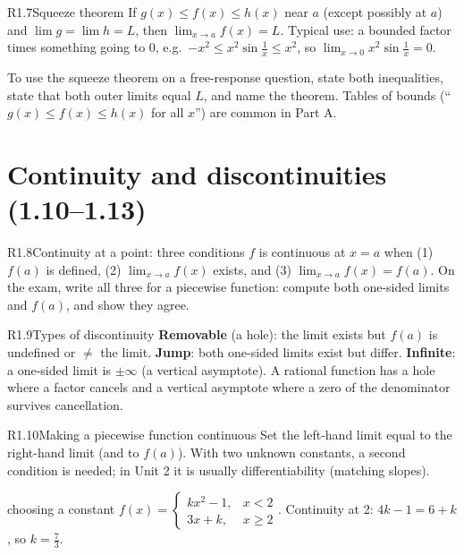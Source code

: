 \documentclass{apcalc}
\begin{document}
\begin{rulebox}{R1.7}{Squeeze theorem}
If $g(x)\le f(x)\le h(x)$ near $a$ (except possibly at $a$) and $\lim g=\lim h=L$, then $\lim_{x\to a}f(x)=L$. Typical use: a bounded factor times something going to 0, e.g.\ $-x^2\le x^2\sin\frac1x\le x^2$, so $\lim_{x\to0}x^2\sin\frac1x=0$.
\end{rulebox}

\begin{frqtip}
To use the squeeze theorem on a free-response question, state both inequalities, state that both outer limits equal $L$, and name the theorem. Tables of bounds (``$g(x)\le f(x)\le h(x)$ for all $x$'') are common in Part A.
\end{frqtip}

\section{Continuity and discontinuities (1.10--1.13)}

\begin{rulebox}{R1.8}{Continuity at a point: three conditions}
$f$ is continuous at $x=a$ when (1) $f(a)$ is defined, (2) $\lim_{x\to a}f(x)$ exists, and (3) $\lim_{x\to a}f(x)=f(a)$. On the exam, write all three for a piecewise function: compute both one-sided limits and $f(a)$, and show they agree.
\end{rulebox}

\begin{rulebox}{R1.9}{Types of discontinuity}
\textbf{Removable} (a hole): the limit exists but $f(a)$ is undefined or $\neq$ the limit. \textbf{Jump}: both one-sided limits exist but differ. \textbf{Infinite}: a one-sided limit is $\pm\infty$ (a vertical asymptote). A rational function has a hole where a factor cancels and a vertical asymptote where a zero of the denominator survives cancellation.
\end{rulebox}

\begin{rulebox}{R1.10}{Making a piecewise function continuous}
Set the left-hand limit equal to the right-hand limit (and to $f(a)$). With two unknown constants, a second condition is needed; in Unit 2 it is usually differentiability (matching slopes).
\end{rulebox}

\begin{example}{choosing a constant}
$f(x)=\begin{cases}kx^2-1,&x<2\\ 3x+k,&x\ge2\end{cases}$. Continuity at 2: $4k-1=6+k$, so $k=\tfrac73$. 
\end{example}
\end{document}
